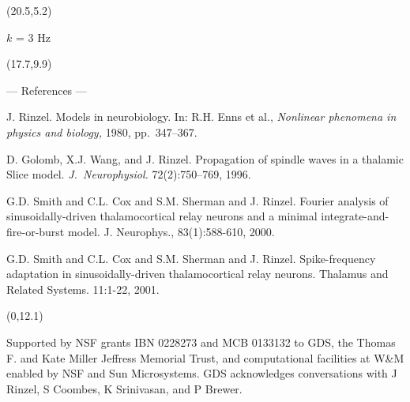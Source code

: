 \documentclass[a0]{a0poster}
\def\CHead#1{\begin{center} {\LARGE\color{DarkBlue} #1} \end{center}}
\begin{document}
\begin{textblock}{2.6}(20.5,5.2)
\begin{center} $k$ = 3 Hz

\end{center}
\end{textblock}


\begin{textblock}{5.3}(17.7,9.9)
\CHead{--- References --- } 
{\small 
J. Rinzel.  Models in neurobiology.  In: R.H. Enns et al., {\it Nonlinear
phenomena in physics and biology,} 1980, pp.~347--367. 

D. Golomb, X.J. Wang, and J. Rinzel. 
Propagation of spindle waves in a thalamic Slice model. 
{\it J.~Neurophysiol.} 72(2):750--769, 1996. 

G.D. Smith and C.L. Cox and S.M. Sherman and J. Rinzel.  Fourier analysis of
sinusoidally-driven thalamocortical relay neurons and a minimal
integrate-and-fire-or-burst model.  J. Neurophys., 83(1):588-610, 2000.

G.D. Smith and C.L. Cox and S.M. Sherman and J. Rinzel.  Spike-frequency
adaptation in sinusoidally-driven thalamocortical relay neurons.  Thalamus and
Related Systems. 11:1-22, 2001.
}
\end{textblock}


\begin{textblock}{23}(0,12.1)
\begin{center}
Supported by NSF grants IBN 0228273 and MCB 0133132 to GDS, the Thomas F. and
Kate Miller Jeffress Memorial Trust, and computational facilities at W\&M
enabled by NSF and Sun Microsystems.  GDS acknowledges conversations with
J Rinzel, S Coombes, K Srinivasan, and P Brewer.  \end{center} \end{textblock}
\end{document}
